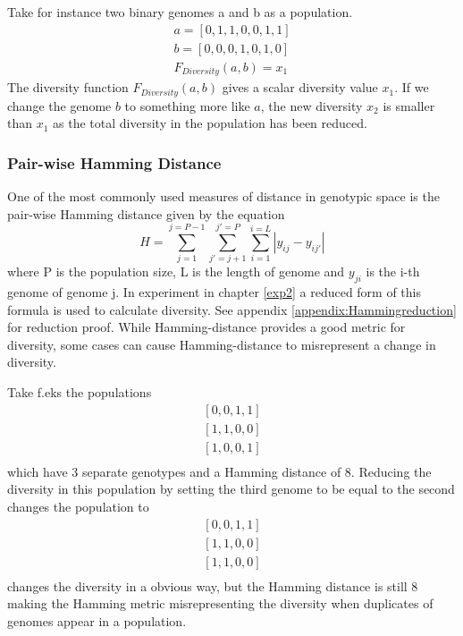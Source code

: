 Take for instance two binary genomes a and b as a population.
\begin{equation*}
    \begin{split}
        a = [0, 1, 1, 0, 0, 1, 1]\\
        b = [0, 0, 0, 1, 0, 1, 0]\\
        F_{\textit{Diversity}}(a, b)=x_{1}
    \end{split}
\end{equation*}
The diversity function \(F_{\textit{Diversity}}(a, b)\) gives a scalar diversity value \(x_{1}\). If we change the genome \(b\) to something more like \(a\), the new diversity \(x_{2}\) is smaller than \(x_{1}\) as the total diversity in the population has been reduced. 

\subsubsection{Pair-wise Hamming Distance}
One of the most commonly used measures of distance in genotypic space\cite{populationDiversity} is the pair-wise Hamming distance given by the equation 
\begin{equation}
    \label{eq:Hamming}
    H=\sum_{j=1}^{j=P-1}\sum_{{j}'=j+1}^{{j}'=P}\sum_{i=1}^{i=L}\left |y_{ij}-y_{i{j}'}\right |
\end{equation}
where P is the population size, L is the length of genome and \(y_{ji}\) is the i-th genome of genome j. In experiment in chapter \ref{exp2} a reduced form of this formula is used to calculate diversity. See appendix \ref{appendix:Hammingreduction} for reduction proof. While Hamming-distance provides a good metric for diversity, some cases can cause Hamming-distance to misrepresent a change in diversity. 

Take f.eks the populations 
\begin{equation*}
    \begin{split}
        [0, 0, 1, 1]\\
        [1, 1, 0, 0]\\
        [1, 0, 0, 1]\\
    \end{split}
\end{equation*}
which have 3 separate genotypes and a Hamming distance of 8. Reducing the diversity in this population by setting the third genome to be equal to the second changes the population to 
\begin{equation*}
    \begin{split}
        [0, 0, 1, 1]\\
        [1, 1, 0, 0]\\
        [1, 1, 0, 0]\\
    \end{split}
\end{equation*}
changes the diversity in a obvious way, but the Hamming distance is still 8 making the Hamming metric misrepresenting the diversity when duplicates of genomes appear in a population. 

